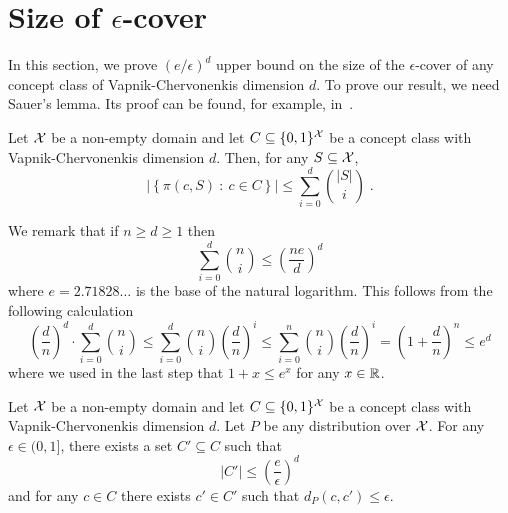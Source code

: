 \section{Size of $\epsilon$-cover}
\label{section:epsilon-cover}

In this section, we prove $(e/\epsilon)^d$ upper bound on the size of the
$\epsilon$-cover of any concept class of Vapnik-Chervonenkis dimension $d$. To
prove our result, we need Sauer's lemma. Its proof can be found, for example,
in~\cite[Chapter 3]{Anthony-Bartlett-1999}.

\begin{lemma}
Let $\mathcal{X}$ be a non-empty domain and let $C \subseteq \{0,1\}^{\mathcal{X}}$ be a concept class
with Vapnik-Chervonenkis dimension $d$. Then, for any $S \subseteq \mathcal{X}$,
$$
\left| \left\{ \pi(c, S) ~:~ c \in C \right\} \right| \le \sum_{i=0}^d \binom{|S|}{i} \; .
$$
\end{lemma}

We remark that if $n \ge d \ge 1$ then
\begin{equation}
\label{equation:sauer-lemma-estimate}
\sum_{i=0}^d \binom{n}{i} \le \left( \frac{ne}{d} \right)^d
\end{equation}
where $e = 2.71828 \dots$ is the base of the natural logarithm. This follows
from the following calculation
$$
\left( \frac{d}{n} \right)^d \cdot \sum_{i=0}^d \binom{n}{i}
\le \sum_{i=0}^d \binom{n}{i} \left( \frac{d}{n} \right)^i
\le \sum_{i=0}^n \binom{n}{i} \left( \frac{d}{n} \right)^i
= \left(1 + \frac{d}{n} \right)^n \le e^d
$$
where we used in the last step that $1 + x \le e^x$ for any $x \in \mathbb{R}$.

\begin{theorem}
Let $\mathcal{X}$ be a non-empty domain and let $C \subseteq \{0,1\}^{\mathcal{X}}$ be a concept
class with Vapnik-Chervonenkis dimension $d$. Let $P$ be any distribution over
$\mathcal{X}$. For any $\epsilon \in (0,1]$, there exists a set $C' \subseteq C$ such that
\begin{equation}
\label{equation:theorem-epsilon-cover}
|C'| \le \left( \frac{e}{\epsilon} \right)^d
\end{equation}
and for any $c \in C$ there exists $c' \in C'$ such that $d_P(c,c') \le \epsilon$.
\end{theorem}

